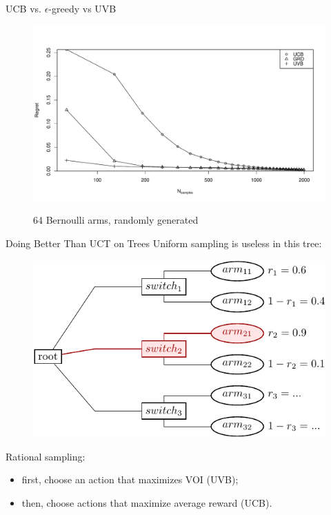 \documentclass{beamer}
\begin{document}
\begin{frame}{UCB vs. $\epsilon$-greedy vs UVB}
\begin{figure}[h]
\centering
\includegraphics[scale=0.45]{onelevel-64.pdf}

64 Bernoulli arms, randomly generated
\end{figure}
\end{frame}

\begin{frame}{Doing Better Than UCT on Trees}
Uniform sampling is useless in this tree:
\begin{figure}[h]
\centering
\includegraphics[scale=0.8]{twolevel-tree.pdf}
\end{figure}
Rational sampling:
\begin{itemize}
\item first, choose an action that maximizes VOI (UVB);
\item then, choose actions that maximize average reward (UCB).
\end{itemize}
\end{frame}{}
\end{document}
